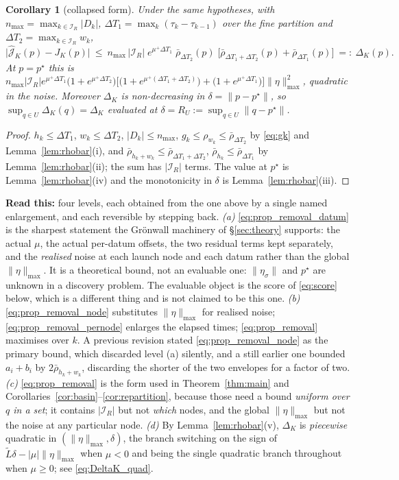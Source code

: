 \documentclass[11pt]{article}
\newtheorem{corollary}{Corollary}
\theoremstyle{remark}\newtheorem{remark}{Remark}
\newcommand{\pstar}{p^\star}
\newcommand{\norm}[1]{\lVert #1\rVert}
\newcommand{\hatJ}{\hat{\mathcal J}}
\newcommand{\readthis}[1]{\textbf{Read this:} #1}
\begin{document}
\begin{corollary}[collapsed form]\label{cor:removal_global}
Under the same hypotheses, with $n_{\max}=\max_{k\in\mathcal I_R}|D_k|$, $\Delta T_1=\max_k(\tau_k-\tau_{k-1})$ over the fine partition and $\Delta T_2=\max_{k\in\mathcal I_R}w_k$,
\begin{equation}
\big|\hatJ_K(p)-J_K(p)\big|\ \le\
n_{\max}\,|\mathcal I_R|\;e^{\mu^{+}\Delta T_1}\;\bar\rho_{\Delta T_2}(p)\;
\Big[\bar\rho_{\Delta T_1+\Delta T_2}(p)+\bar\rho_{\Delta T_1}(p)\Big]\ =:\ \Delta_K(p).
\label{eq:prop_removal}
\end{equation}
At $p=\pstar$ this is
$n_{\max}|\mathcal I_R|e^{\mu^{+}\Delta T_1}\big(1+e^{\mu^{+}\Delta T_2}\big)
\big[\big(1+e^{\mu^{+}(\Delta T_1+\Delta T_2)}\big)+\big(1+e^{\mu^{+}\Delta T_1}\big)\big]\norm\eta_{\max}^{2}$, quadratic in the noise. Moreover $\Delta_K$ is non-decreasing in $\delta=\norm{p-\pstar}$, so $\sup_{q\in U}\Delta_K(q)=\Delta_K$ evaluated at $\delta=R_U:=\sup_{q\in U}\norm{q-\pstar}$.
\end{corollary}
\begin{proof}
$h_k\le\Delta T_1$, $w_k\le\Delta T_2$, $|D_k|\le n_{\max}$, $g_k\le\rho_{w_k}\le\bar\rho_{\Delta T_2}$ by \eqref{eq:gk} and Lemma~\ref{lem:rhobar}(i), and $\bar\rho_{h_k+w_k}\le\bar\rho_{\Delta T_1+\Delta T_2}$, $\bar\rho_{h_k}\le\bar\rho_{\Delta T_1}$ by Lemma~\ref{lem:rhobar}(ii); the sum has $|\mathcal I_R|$ terms. The value at $\pstar$ is Lemma~\ref{lem:rhobar}(iv) and the monotonicity in $\delta$ is Lemma~\ref{lem:rhobar}(iii).
\end{proof}
\readthis{four levels, each obtained from the one above by a single named enlargement, and each reversible by stepping back.
\emph{(a)} \eqref{eq:prop_removal_datum} is the sharpest statement the Gr\"onwall machinery of \S\ref{sec:theory} supports: the actual $\mu$, the actual per-datum offsets, the two residual terms kept separately, and the \emph{realised} noise at each launch node and each datum rather than the global $\norm\eta_{\max}$. It is a theoretical bound, not an evaluable one: $\norm{\eta_\sigma}$ and $\pstar$ are unknown in a discovery problem. The evaluable object is the score of \eqref{eq:score} below, which is a different thing and is not claimed to be this one.
\emph{(b)} \eqref{eq:prop_removal_node} substitutes $\norm\eta_{\max}$ for realised noise; \eqref{eq:prop_removal_pernode} enlarges the elapsed times; \eqref{eq:prop_removal} maximises over $k$. A previous revision stated \eqref{eq:prop_removal_node} as the primary bound, which discarded level (a) silently, and a still earlier one bounded $a_i+b_i$ by $2\bar\rho_{h_k+w_k}$, discarding the shorter of the two envelopes for a factor of two.
\emph{(c)} \eqref{eq:prop_removal} is the form used in Theorem~\ref{thm:main} and Corollaries~\ref{cor:basin}--\ref{cor:repartition}, because those need a bound \emph{uniform over $q$ in a set}; it contains $|\mathcal I_R|$ but not \emph{which} nodes, and the global $\norm\eta_{\max}$ but not the noise at any particular node.
\emph{(d)} By Lemma~\ref{lem:rhobar}(v), $\Delta_K$ is \emph{piecewise} quadratic in $(\norm\eta_{\max},\delta)$, the branch switching on the sign of $\tilde L\delta-|\mu|\norm\eta_{\max}$ when $\mu<0$ and being the single quadratic branch throughout when $\mu\ge0$; see \eqref{eq:DeltaK_quad}.}
\end{document}

